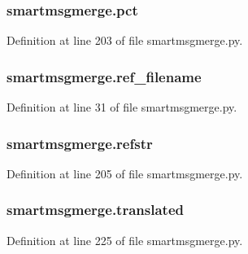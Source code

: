 \subsubsection[{\texorpdfstring{pct}{pct}}]{\setlength{\rightskip}{0pt plus 5cm}smartmsgmerge.\+pct}\hypertarget{namespacesmartmsgmerge_a0051391e6456ea14774d4516b9244d86}{}\label{namespacesmartmsgmerge_a0051391e6456ea14774d4516b9244d86}


Definition at line 203 of file smartmsgmerge.\+py.

\subsubsection[{\texorpdfstring{ref\+\_\+filename}{ref_filename}}]{\setlength{\rightskip}{0pt plus 5cm}smartmsgmerge.\+ref\+\_\+filename}\hypertarget{namespacesmartmsgmerge_a55eb929ba8ca04c449d464a49a3be6eb}{}\label{namespacesmartmsgmerge_a55eb929ba8ca04c449d464a49a3be6eb}


Definition at line 31 of file smartmsgmerge.\+py.

\subsubsection[{\texorpdfstring{refstr}{refstr}}]{\setlength{\rightskip}{0pt plus 5cm}smartmsgmerge.\+refstr}\hypertarget{namespacesmartmsgmerge_a947966886a875c9716793981e78924f3}{}\label{namespacesmartmsgmerge_a947966886a875c9716793981e78924f3}


Definition at line 205 of file smartmsgmerge.\+py.

\subsubsection[{\texorpdfstring{translated}{translated}}]{\setlength{\rightskip}{0pt plus 5cm}smartmsgmerge.\+translated}\hypertarget{namespacesmartmsgmerge_a29e7adb972fefe8640e8cb70d599a8e6}{}\label{namespacesmartmsgmerge_a29e7adb972fefe8640e8cb70d599a8e6}


Definition at line 225 of file smartmsgmerge.\+py.

